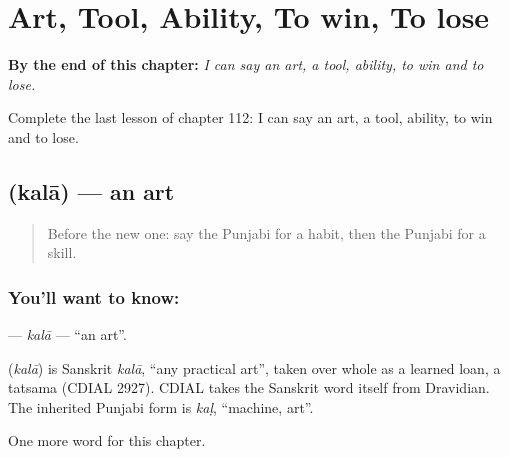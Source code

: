 
\chapter{Art, Tool, Ability, To win, To lose}
\label{ch:pa-art-tool-ability-to-win-to-lose}

\begin{chapteropening}
\textbf{By the end of this chapter:} \emph{I can say an art, a tool, ability, to win and to lose.}

Complete the last lesson of chapter 112: I can say an art, a tool, ability, to win and to lose.
\end{chapteropening}

\section[\texorpdfstring{\pa{ਕਲਾ} (kalā)}{ਕਲਾ (kalā)}]{ (kalā) — an art}

\label{lesson:PA-C112-kala}



\begin{quote}
Before the new one: say the Punjabi for a habit, then the Punjabi for a skill.
\end{quote}

\subsection*{You'll want to know: }
\textbf{} — \emph{kalā} — \textquotedblleft{}an art\textquotedblright{}.

\begin{cousinweb}
\textbf{} (\emph{kalā}) is Sanskrit \emph{kalā}, \textquotedblleft{}any practical art\textquotedblright{}, taken over whole as a learned loan, a tatsama (CDIAL 2927). CDIAL takes the Sanskrit word itself from Dravidian. The inherited Punjabi form is \emph{kaḷ}, \textquotedblleft{}machine, art\textquotedblright{}.
\end{cousinweb}

\begin{grammarlens}[title={What you've built}]
One more word for this chapter.
\end{grammarlens}

